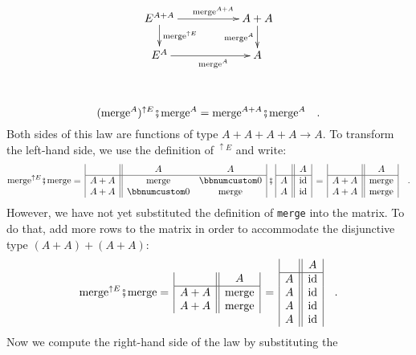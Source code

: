 \begin{wrapfigure}{L}{0.3\columnwidth}%
\vspace{-1.8\baselineskip}
\[
\xymatrix{\xyScaleY{1.5pc}\xyScaleX{4.5pc}E^{A+A}\ar[d]\sp(0.45){\text{merge}^{\uparrow E}}\ar[r]\sp(0.55){\text{merge}^{A+A}} & A+A\ar[d]\sb(0.5){\text{merge}^{A}}\\
E^{A}\ar[r]\sb(0.55){\text{merge}^{A}} & A
}
\]
\vspace{-0.6\baselineskip}
\end{wrapfigure}%

~\vspace{-0.3\baselineskip}
\[
(\text{merge}^{A})^{\uparrow E}\bef\text{merge}^{A}=\text{merge}^{A+A}\bef\text{merge}^{A}\quad.
\]
Both sides of this law are functions of type $A+A+A+A\rightarrow A$.
To transform the left-hand side, we use the definition of $^{\uparrow E}$
and write:
\[
\text{merge}^{\uparrow E}\bef\text{merge}=\,\begin{array}{|c||cc|}
 & A & A\\
\hline A+A & \text{merge} & \bbnum 0\\
A+A & \bbnum 0 & \text{merge}
\end{array}\,\bef\,\begin{array}{|c||c|}
 & A\\
\hline A & \text{id}\\
A & \text{id}
\end{array}\,=\,\begin{array}{|c||c|}
 & A\\
\hline A+A & \text{merge}\\
A+A & \text{merge}
\end{array}\quad.
\]
However, we have not yet substituted the definition of \lstinline!merge!
into the matrix. To do that, add more rows to the matrix in order
to accommodate the disjunctive type $(A+A)+(A+A)$:
\[
\text{merge}^{\uparrow E}\bef\text{merge}=\,\begin{array}{|c||c|}
 & A\\
\hline A+A & \text{merge}\\
A+A & \text{merge}
\end{array}\,=\,\begin{array}{|c||c|}
 & A\\
\hline A & \text{id}\\
A & \text{id}\\
A & \text{id}\\
A & \text{id}
\end{array}\quad.
\]
Now we compute the right-hand side of the law by substituting the

